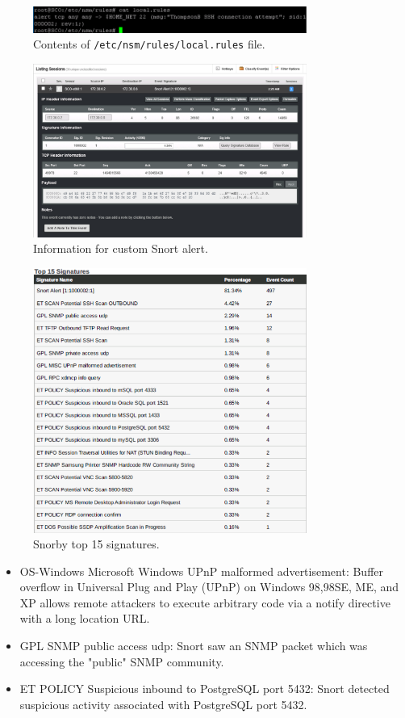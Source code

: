 \documentclass[a4paper]{article}
\begin{document}
	\begin{figure}[ht!]
		\centering
		\includegraphics[width=0.8\textwidth]{2_1_18}
		\caption{Contents of \verb+/etc/nsm/rules/local.rules+ file.}
		\label{fig:2_1_18}
	\end{figure}
	
	\begin{figure}[ht!]
		\centering
		\includegraphics[width=0.8\textwidth]{2_1_26}
		\caption{Information for custom Snort alert.}
		\label{fig:2_1_26}
	\end{figure}

	\begin{figure}[ht!]
		\centering
		\includegraphics[width=0.8\textwidth]{2_3_7}
		\caption{Snorby top 15 signatures.}
		\label{fig:2_3_7}
	\end{figure}
	
	\begin{itemize}
		\item OS-Windows Microsoft Windows UPnP malformed advertisement: Buffer overflow in Universal
			Plug and Play (UPnP) on Windows 98,98SE, ME, and XP allows remote attackers to
			execute arbitrary code via a notify directive with a long location URL.
		\item GPL SNMP public access udp: Snort saw an SNMP packet which was accessing the "public" 
			SNMP community.
		\item ET POLICY Suspicious inbound to PostgreSQL port 5432: Snort detected suspicious activity
			associated with PostgreSQL port 5432.
	\end{itemize}
\end{document}
